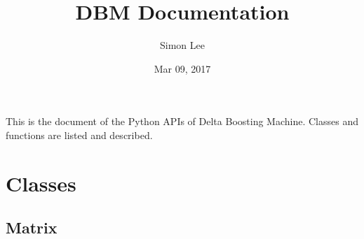 \documentclass[letterpaper,10pt,english]{sphinxmanual}
\title{DBM Documentation}
\date{Mar 09, 2017}
\author{Simon Lee}
\begin{document}
\maketitle
\sphinxtableofcontents
{}\label{\detokenize{index::doc}}


This is the document of the Python APIs of Delta Boosting Machine. Classes and functions are listed and described.


\chapter{Classes}
\label{\detokenize{index:welcome-to-dbm-s-documentation}}\label{\detokenize{index:classes}}

\section{Matrix}
\label{\detokenize{index:matrix}}
\end{document}
